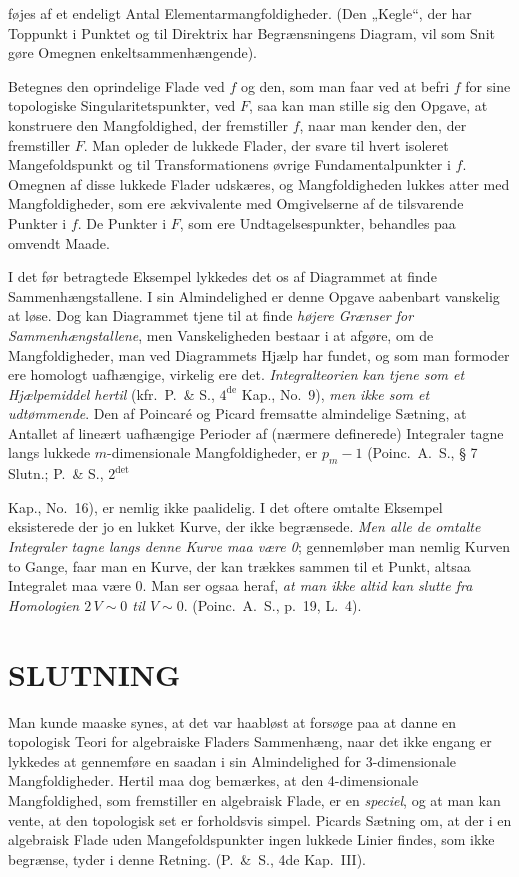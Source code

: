 \documentclass{article}
\begin{document}
føjes af et endeligt Antal Elementarmangfoldigheder. (Den „Kegle“, der har Toppunkt i Punktet og til Direktrix har Begrænsningens Diagram, vil som Snit gøre Omegnen enkeltsammenhængende).

Betegnes den oprindelige Flade ved $f$ og den, som man faar ved at befri $f$ for sine topologiske Singularitetspunkter, ved $F$, saa kan man stille sig den Opgave, at konstruere den Mangfoldighed, der fremstiller $f$, naar man kender den, der fremstiller $F$. Man opleder de lukkede Flader, der svare til hvert isoleret Mangefoldspunkt og til Transformationens øvrige Fundamentalpunkter i $f$. Omegnen af disse lukkede Flader udskæres, og Mangfoldigheden lukkes atter med Mangfoldigheder, som ere ækvivalente med Omgivelserne af de tilsvarende Punkter i $f$. De Punkter i $F$, som ere Undtagelsespunkter, behandles paa omvendt Maade.

I det før betragtede Eksempel lykkedes det os af Diagrammet at finde Sammenhængstallene. I sin Almindelighed er denne Opgave aabenbart vanskelig at løse. Dog kan Diagrammet tjene til at finde \emph{højere Grænser for Sammenhængstallene}, men Vanskeligheden bestaar i at afgøre, om de Mangfoldigheder, man ved Diagrammets Hjælp har fundet, og som man formoder ere homologt uafhængige, virkelig ere det. \emph{Integralteorien kan tjene som et Hjælpemiddel hertil} (kfr.\ P.\ \& S., $4^{\text{de}}$ Kap., No.\ 9), \emph{men ikke som et udtømmende}. Den af Poincaré og Picard fremsatte almindelige Sætning, at Antallet af lineært uafhængige Perioder af (nærmere definerede) Integraler tagne langs lukkede $m$-dimensionale Mangfoldigheder, er $p_m - 1$ (Poinc.\ A.\ S., § 7 Slutn.; P.\ \& S., $2^{\text{det}}$

Kap., No.\ 16), er nemlig ikke paalidelig. I det oftere omtalte Eksempel eksisterede der jo en lukket Kurve, der ikke begrænsede. \emph{Men alle de omtalte Integraler tagne langs denne Kurve maa være 0}; gennemløber man nemlig Kurven to Gange, faar man en Kurve, der kan trækkes sammen til et Punkt, altsaa Integralet maa være 0. Man ser ogsaa heraf, \emph{at man ikke altid kan slutte fra Homologien $2\,V \sim 0$ til $V \sim 0$}. (Poinc.\ A.\ S., p.\ 19, L.\ 4).

\section*{SLUTNING}

Man kunde maaske synes, at det var haabløst at forsøge paa at danne en topologisk Teori for algebraiske Fladers Sammenhæng, naar det ikke engang er lykkedes at gennemføre en saadan i sin Almindelighed for 3-dimensionale Mangfoldigheder. Hertil maa dog bemærkes, at den 4-dimensionale Mangfoldighed, som fremstiller en algebraisk Flade, er en \emph{speciel}, og at man kan vente, at den topologisk set er forholdsvis simpel. Picards Sætning om, at der i en algebraisk Flade uden Mangefoldspunkter ingen lukkede Linier findes, som ikke begrænse, tyder i denne Retning. (P.~\&~S., 4de Kap.\ III).
\end{document}
